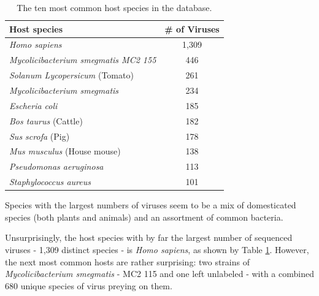 \documentclass[12pt]{article}
\begin{document}
    \begin{table}[H]
        \begin{center}
            \begin{tabular}{|l||c|}
                \hline
                Host species                                 & \# of Viruses \\ \hline\hline
                \textit{Homo sapiens}                        & 1,309         \\ \hline
                \textit{Mycolicibacterium smegmatis MC2 155} & 446           \\ \hline
                \textit{Solanum Lycopersicum} (Tomato)       & 261           \\ \hline
                \textit{Mycolicibacterium smegmatis}         & 234           \\ \hline
                \textit{Escheria coli}                       & 185           \\ \hline
                \textit{Bos taurus} (Cattle)                 & 182           \\ \hline
                \textit{Sus scrofa} (Pig)                    & 178           \\ \hline
                \textit{Mus musculus} (House mouse)          & 138           \\ \hline
                \textit{Pseudomonas aeruginosa}              & 113           \\ \hline
                \textit{Staphylococcus aureus}               & 101           \\ \hline    
            \end{tabular}
            \caption{The ten most common host species in the database.}
            \label{most_common_hosts_table}
        \end{center}
    \end{table}

    Species with the largest numbers of viruses seem to be a mix of domesticated
    species (both plants and animals) and an assortment of common bacteria.

    Unsurprisingly, the host species with by far the largest number of
    sequenced viruses - 1,309 distinct species - is \emph{Homo sapiens}, as
    shown by Table \ref{most_common_hosts_table}. However, the next most
    common hosts are rather surprising: two strains of 
    \emph{Mycolicibacterium smegmatis} - MC2 115 and one left unlabeled - with a
    combined 680 unique species of virus preying on them.
\end{document}
